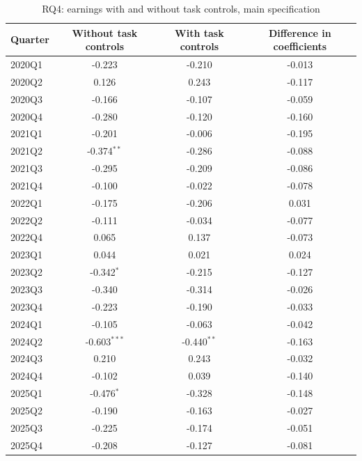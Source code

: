 \begin{table}[htbp]\centering
\caption{RQ4: earnings with and without task controls, main specification}
\begin{tabular}{lccc}
\toprule
Quarter & Without task controls & With task controls & Difference in coefficients \\
\midrule
2020Q1 & -0.223 & -0.210 & -0.013 \\
2020Q2 & 0.126 & 0.243 & -0.117 \\
2020Q3 & -0.166 & -0.107 & -0.059 \\
2020Q4 & -0.280 & -0.120 & -0.160 \\
2021Q1 & -0.201 & -0.006 & -0.195 \\
2021Q2 & -0.374$^{**}$ & -0.286 & -0.088 \\
2021Q3 & -0.295 & -0.209 & -0.086 \\
2021Q4 & -0.100 & -0.022 & -0.078 \\
2022Q1 & -0.175 & -0.206 & 0.031 \\
2022Q2 & -0.111 & -0.034 & -0.077 \\
2022Q4 & 0.065 & 0.137 & -0.073 \\
2023Q1 & 0.044 & 0.021 & 0.024 \\
2023Q2 & -0.342$^{*}$ & -0.215 & -0.127 \\
2023Q3 & -0.340 & -0.314 & -0.026 \\
2023Q4 & -0.223 & -0.190 & -0.033 \\
2024Q1 & -0.105 & -0.063 & -0.042 \\
2024Q2 & -0.603$^{***}$ & -0.440$^{**}$ & -0.163 \\
2024Q3 & 0.210 & 0.243 & -0.032 \\
2024Q4 & -0.102 & 0.039 & -0.140 \\
2025Q1 & -0.476$^{*}$ & -0.328 & -0.148 \\
2025Q2 & -0.190 & -0.163 & -0.027 \\
2025Q3 & -0.225 & -0.174 & -0.051 \\
2025Q4 & -0.208 & -0.127 & -0.081 \\
\bottomrule
\end{tabular}
\par\vspace{2pt}{\footnotesize Difference = without minus with task controls; point estimate only, with no standard error, so it is not a tested composition effect. Average difference: pre-period -0.084, post-period -0.071. * p<0.10, ** p<0.05, *** p<0.01.}
\end{table}
